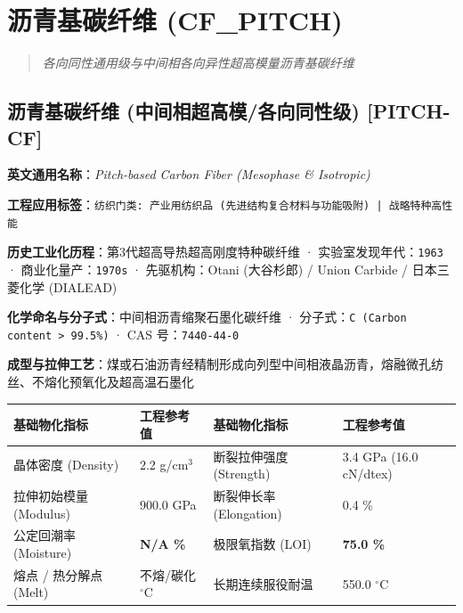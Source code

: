 \documentclass[11pt,openright,twoside,UTF8]{ctexbook}
\begin{document}
\chapter{沥青基碳纤维 (CF\_PITCH)}
\begin{quote}
\small\itshape
各向同性通用级与中间相各向异性超高模量沥青基碳纤维
\end{quote}

\section{沥青基碳纤维 (中间相超高模/各向同性级) [PITCH-CF]}
\label{sec:pitch-cf}

\noindent\textbf{英文通用名称}：\textit{Pitch-based Carbon Fiber (Mesophase \& Isotropic)}\par
\noindent\textbf{工程应用标签}：\texttt{纺织门类: 产业用纺织品 (先进结构复合材料与功能吸附) | 战略特种高性能}\par
\noindent\textbf{历史工业化历程}：第3代超高导热超高刚度特种碳纤维 · 实验室发现年代：\texttt{1963} · 商业化量产：\texttt{1970s} · 先驱机构：Otani (大谷杉郎) / Union Carbide / 日本三菱化学 (DIALEAD)\par
\noindent\textbf{化学命名与分子式}：中间相沥青缩聚石墨化碳纤维 · 分子式：\texttt{C (Carbon content \textgreater{} 99.5\%)} · CAS 号：\texttt{7440-44-0}\par
\noindent\textbf{成型与拉伸工艺}：煤或石油沥青经精制形成向列型中间相液晶沥青，熔融微孔纺丝、不熔化预氧化及超高温石墨化\par

\vspace{0.15cm}
\begin{center}
\small
\begin{tabularx}{\textwidth}{p{3.8cm}Xp{3.8cm}X}
\toprule
\textbf{基础物化指标} & \textbf{工程参考值} & \textbf{基础物化指标} & \textbf{工程参考值} \\
\midrule
晶体密度 (Density) & 2.2 g/cm$^3$ & 断裂拉伸强度 (Strength) & 3.4 GPa (16.0 cN/dtex) \\
拉伸初始模量 (Modulus) & 900.0 GPa & 断裂伸长率 (Elongation) & 0.4 \% \\
公定回潮率 (Moisture) & \textbf{N/A \%} & 极限氧指数 (LOI) & \textbf{75.0 \%} \\
熔点 / 热分解点 (Melt) & 不熔/碳化 $^\circ\mathrm{C}$ & 长期连续服役耐温 & 550.0 $^\circ\mathrm{C}$ \\
\bottomrule
\end{tabularx}
\end{center}
\vspace{0.15cm}
\end{document}
